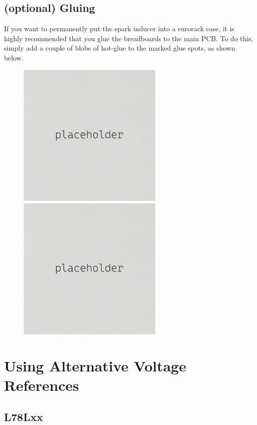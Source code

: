 \documentclass[12pt, a4paper]{article}
\begin{document}
\pagebreak
\subsection{\smaller (optional) \enspace \larger Gluing}
\label{ssec:gluing}

If you want to permanently put the spark inducer into a eurorack case, it is highly recommended
that you glue the breadboards to the main PCB. To do this, simply add a couple of blobs of
hot-glue to the marked glue spots, as shown below.

\begin{figure}[H]
    \centering
    \includegraphics[width=7cm]{images/placeholder.jpg}
    \hspace{2mm}
    \includegraphics[width=7cm]{images/placeholder.jpg}
\end{figure}

\pagebreak
\section*{Using Alternative Voltage References}

\subsection*{L78Lxx}
\end{document}
